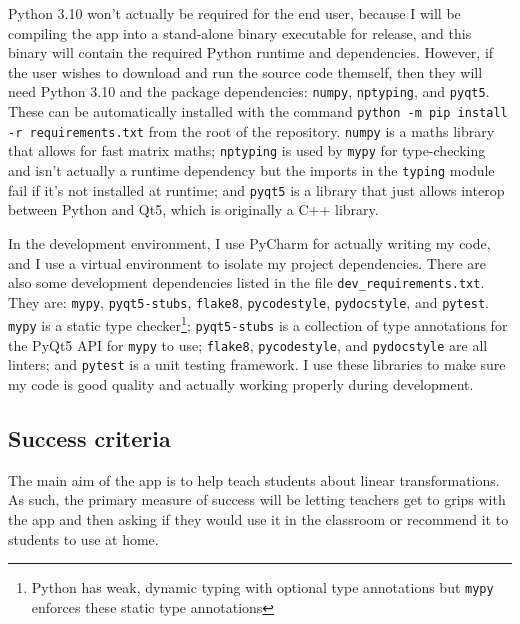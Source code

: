 \documentclass[../main.tex]{subfiles}
\begin{document}
Python 3.10 won't actually be required for the end user, because I will be compiling the app into a stand-alone binary executable for release, and this binary will contain the required Python runtime and dependencies. However, if the user wishes to download and run the source code themself, then they will need Python 3.10 and the package dependencies: \texttt{numpy}, \texttt{nptyping}, and \texttt{pyqt5}. These can be automatically installed with the command \texttt{python -m pip install -r requirements.txt} from the root of the repository. \texttt{numpy} is a maths library that allows for fast matrix maths; \texttt{nptyping} is used by \texttt{mypy} for type-checking and isn't actually a runtime dependency but the imports in the \texttt{typing} module fail if it's not installed at runtime; and \texttt{pyqt5} is a library that just allows interop between Python and Qt5, which is originally a C++ library.

In the development environment, I use PyCharm for actually writing my code, and I use a virtual environment to isolate my project dependencies. There are also some development dependencies listed in the file \texttt{dev\_requirements.txt}. They are: \texttt{mypy}, \texttt{pyqt5-stubs}, \texttt{flake8}, \texttt{pycodestyle}, \texttt{pydocstyle}, and \texttt{pytest}. \texttt{mypy} is a static type checker\footnote{Python has weak, dynamic typing with optional type annotations but \texttt{mypy} enforces these static type annotations}; \texttt{pyqt5-stubs} is a collection of type annotations for the PyQt5 API for \texttt{mypy} to use; \texttt{flake8}, \texttt{pycodestyle}, and \texttt{pydocstyle} are all linters; and \texttt{pytest} is a unit testing framework. I use these libraries to make sure my code is good quality and actually working properly during development.

\subsection{Success criteria\label{subsection:success-criteria}}

The main aim of the app is to help teach students about linear transformations. As such, the primary measure of success will be letting teachers get to grips with the app and then asking if they would use it in the classroom or recommend it to students to use at home.
\end{document}
